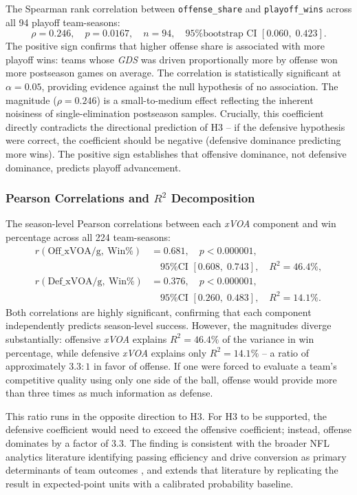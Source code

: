 \documentclass[12pt,a4paper]{article}
\newcommand{\xvoa}{\textit{xVOA}}
\newcommand{\gds}{\textit{GDS}}
\begin{document}
The Spearman rank correlation between \texttt{offense\_share} and \texttt{playoff\_wins} across all 94 playoff team-seasons:
\[
  \rho = 0.246, \quad p = 0.0167, \quad n = 94, \quad \text{95\% bootstrap CI } [0.060,\; 0.423].
\]
The positive sign confirms that higher offense share is associated with more playoff wins: teams whose \gds{} was driven proportionally more by offense won more postseason games on average. The correlation is statistically significant at $\alpha = 0.05$, providing evidence against the null hypothesis of no association. The magnitude ($\rho = 0.246$) is a small-to-medium effect reflecting the inherent noisiness of single-elimination postseason samples. Crucially, this coefficient directly contradicts the directional prediction of H3 -- if the defensive hypothesis were correct, the coefficient should be negative (defensive dominance predicting more wins). The positive sign establishes that offensive dominance, not defensive dominance, predicts playoff advancement.

\subsubsection{Pearson Correlations and $R^2$ Decomposition}

The season-level Pearson correlations between each \xvoa{} component and win percentage across all 224 team-seasons:
\begin{align*}
  r(\text{Off\_xVOA/g},\ \text{Win\%}) &= 0.681,\quad p < 0.000001, \\
  &\quad \text{95\% CI } [0.608,\; 0.743],\quad R^2 = 46.4\%, \\[4pt]
  r(\text{Def\_xVOA/g},\ \text{Win\%}) &= 0.376,\quad p < 0.000001, \\
  &\quad \text{95\% CI } [0.260,\; 0.483],\quad R^2 = 14.1\%.
\end{align*}
Both correlations are highly significant, confirming that each component independently predicts season-level success. However, the magnitudes diverge substantially: offensive \xvoa{} explains $R^2 = 46.4\%$ of the variance in win percentage, while defensive \xvoa{} explains only $R^2 = 14.1\%$ -- a ratio of approximately $3.3 : 1$ in favor of offense. If one were forced to evaluate a team's competitive quality using only one side of the ball, offense would provide more than three times as much information as defense.

This ratio runs in the opposite direction to H3. For H3 to be supported, the defensive coefficient would need to exceed the offensive coefficient; instead, offense dominates by a factor of 3.3. The finding is consistent with the broader NFL analytics literature identifying passing efficiency and drive conversion as primary determinants of team outcomes \citep{yurko2019nflwar}, and extends that literature by replicating the result in expected-point units with a calibrated probability baseline.
\end{document}
